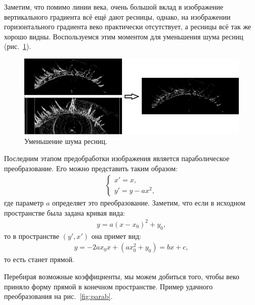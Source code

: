 \documentclass[12pt,a4paper]{article} %
\begin{document}
Заметим, что помимо линии века, очень большой вклад в изображение вертикального градиента всё ещё дают ресницы, однако, на изображении горизонтального градиента веко практически отсутствует, а ресницы всё так же хорошо видны. Воспользуемся этим моментом для уменьшения шума ресниц (рис.~\ref{fig:diff}).
\begin{figure}[h]
	
	\centering
	
	\includegraphics[width=0.8\linewidth]{diff.jpg}
	
	\caption{Уменьшение шума ресниц.}
	
	\label{fig:diff}
	
\end{figure}

Последним этапом предобработки изображения является параболическое преобразование. Его можно представить таким образом:
\begin{gather}\label{parab2}
\begin{cases}
		x' = x,
		\\
		y' = y - ax^2,
	\end{cases}
\end{gather}
где параметр $a$ определяет это преобразование. Заметим, что если в исходном пространстве была задана кривая вида:
\begin{gather}\label{parab3}
 y = a(x-x_0)^2 + y_0,
\end{gather} 
то в пространстве $(y', x')$ она примет вид: 
\begin{gather}\label{parab4}
y = -2ax_0 x + (ax_0^2 + y_0) = bx + c,
\end{gather} 
то есть станет прямой.

Перебирая возможные коэффициенты, мы можем добиться того, чтобы веко приняло форму прямой в конечном пространстве. Пример удачного преобразования на рис.~\ref{fig:parab}.
\end{document}
